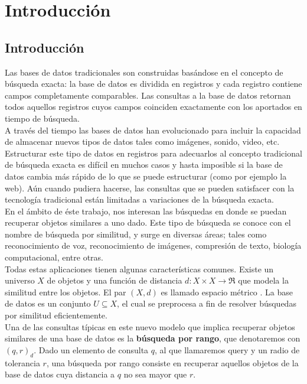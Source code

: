 \chapter{Introducci\'on}

\section{Introducci\'on}
Las bases de datos tradicionales son construidas bas\'andose en el concepto de b\'usqueda exacta: la base de datos es dividida en registros y cada registro contiene campos completamente comparables. Las consultas a la base de datos retornan todos aquellos registros cuyos campos coinciden exactamente con los aportados en tiempo de b\'usqueda.\\
				
A trav\'es del tiempo las bases de datos han evolucionado para incluir la capacidad de almacenar nuevos tipos de datos tales como im\'agenes, sonido, video, etc. Estructurar este tipo de datos en registros para adecuarlos al concepto tradicional de b\'usqueda exacta es dif\'icil en muchos casos y hasta imposible si la base de datos cambia m\'as r\'apido de lo que se puede estructurar (como por ejemplo la web). A\'un cuando pudiera hacerse, las consultas que se pueden satisfacer con la tecnolog\'ia tradicional est\'an limitadas a variaciones de la b\'usqueda exacta.\\
					
En el \'ambito de \'este trabajo, nos interesan las b\'usquedas en donde se puedan recuperar objetos similares a uno dado. Este tipo de b\'usqueda se conoce con el nombre de b\'usqueda por similitud, y surge en diversas \'areas; tales como reconocimiento de voz, reconocimiento de im\'agenes, compresi\'on de texto, biolog\'ia computacional, entre otras.\\
					
Todas estas aplicaciones tienen algunas caracter\'isticas comunes. Existe un universo $X$ de objetos y una funci\'on de distancia $d: X \times X \rightarrow \Re$ que modela la similitud entre los objetos. El par $(X, d)$ es llamado espacio m\'etrico \cite{defespaciometrico}. La base de datos es un conjunto $U \subseteq X$, el cual se preprocesa a fin de resolver b\'usquedas por similitud eficientemente.\\
					
Una de las consultas t\'ipicas en este nuevo modelo que implica recuperar objetos similares de una base de datos es la \textbf{b\'usqueda por rango}, que denotaremos con $(q, r)_d$. Dado un elemento de consulta $q$, al que llamaremos query y un radio de tolerancia $r$, una b\'usqueda por rango consiste en recuperar aquellos objetos de la base de datos cuya distancia a $q$ no sea mayor que $r$.\\

